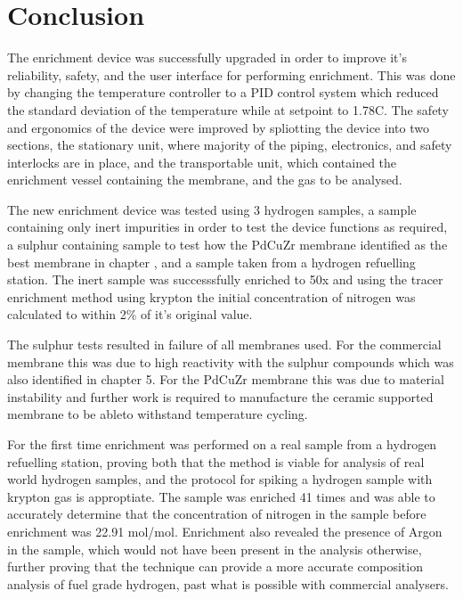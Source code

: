\section{Conclusion}
The enrichment device was successfully upgraded in order to improve it's reliability, safety, and the user interface for performing enrichment. This was done by changing the temperature controller to a PID control system which reduced the standard deviation of the temperature while at setpoint to 1.78\textdegree C. The safety and ergonomics of the device were improved by spliotting the device into two sections, the stationary unit, where majority of the piping, electronics, and safety interlocks are in place, and the transportable unit, which contained the enrichment vessel containing the membrane, and the gas to be analysed. 

The new enrichment device was tested using 3 hydrogen samples, a sample containing only inert impurities in order to test the device functions as required, a sulphur containing sample to test how the PdCuZr membrane identified as the best membrane in chapter \label{proc-testingchapref}, and a sample taken from a hydrogen refuelling station. The inert sample was successsfully enriched to 50x and using the tracer enrichment method using krypton the initial concentration of nitrogen was calculated to within 2\% of it's original value. 

The sulphur tests resulted in failure of all membranes used. For the commercial membrane this was due to high reactivity with the sulphur compounds which was also identified in chapter 5. For the PdCuZr membrane this was due to material instability and further work is required to manufacture the ceramic supported membrane to be ableto withstand temperature cycling. 

For the first time enrichment was performed on a real sample from a hydrogen refuelling station, proving both that the method is viable for analysis of real world hydrogen samples, and the protocol for spiking a hydrogen sample with krypton gas is approptiate. The sample was enriched 41 times and was able to accurately determine that the concentration of nitrogen in the sample before enrichment was 22.91 \textmu mol/mol. Enrichment also revealed the presence of Argon in the sample, which would not have been present in the analysis otherwise, further proving that the technique can provide a more accurate composition analysis of fuel grade hydrogen, past what is possible with commercial analysers.


